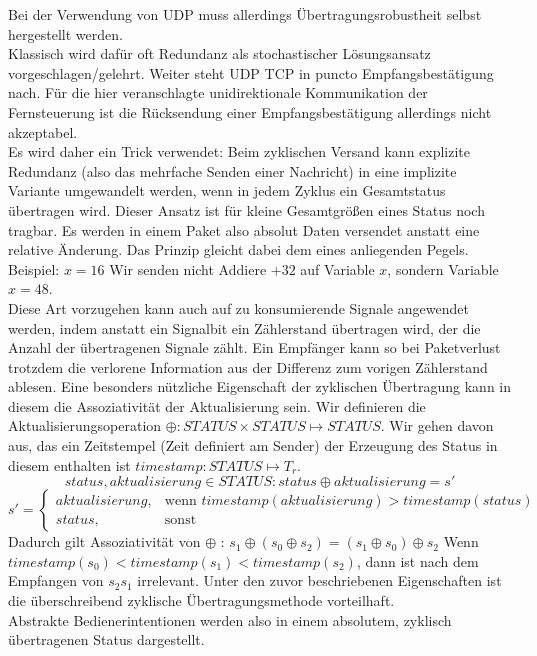 Bei der Verwendung von UDP muss allerdings Übertragungsrobustheit selbst hergestellt werden. \\
Klassisch wird dafür oft Redundanz als stochastischer Lösungsansatz vorgeschlagen/gelehrt.
Weiter steht UDP TCP in puncto Empfangsbestätigung nach. Für die hier veranschlagte unidirektionale Kommunikation der Fernsteuerung ist die Rücksendung einer Empfangsbestätigung allerdings nicht akzeptabel.\\
Es wird daher ein Trick verwendet:
Beim zyklischen Versand kann explizite Redundanz (also das mehrfache Senden einer Nachricht) in eine implizite Variante umgewandelt werden, wenn in jedem Zyklus ein Gesamtstatus übertragen wird.
Dieser Ansatz ist für kleine Gesamtgrößen eines Status noch tragbar.
Es werden in einem Paket also absolut Daten versendet anstatt eine relative Änderung. Das Prinzip gleicht dabei dem eines anliegenden Pegels. Beispiel:
$x = 16$ Wir senden nicht \glqq Addiere $+32$ auf Variable $x$\grqq , sondern \glqq Variable $x = 48$\grqq .\\
Diese Art vorzugehen kann auch auf zu konsumierende Signale angewendet werden, indem anstatt ein Signalbit ein Zählerstand übertragen wird, der die Anzahl der übertragenen Signale zählt. Ein Empfänger kann so bei Paketverlust trotzdem die verlorene Information aus der Differenz zum vorigen Zählerstand ablesen.
Eine besonders nützliche Eigenschaft der zyklischen Übertragung kann in diesem die Assoziativität der Aktualisierung sein. Wir definieren die Aktualisierungsoperation $\oplus : STATUS \times STATUS \mapsto STATUS$. Wir gehen davon aus, das ein Zeitstempel (Zeit definiert am Sender) der Erzeugung des Status in diesem enthalten ist $timestamp: STATUS \mapsto T_r$.
$$ status, aktualisierung \in STATUS : status \oplus aktualisierung = s' $$
$$
s' =
\begin{cases}
	aktualisierung,& \text{wenn } timestamp(aktualisierung) > timestamp(status)\\
    status,              & \text{sonst}
\end{cases}
 $$
 Dadurch gilt Assoziativität von $\oplus$ : $ s_1 \oplus (s_0 \oplus s_2) = (s_1 \oplus s_0) \oplus s_2 $
 Wenn $timestamp(s_0) < timestamp(s_1) < timestamp(s_2)$, dann ist nach dem Empfangen von $s_2 s_1$ irrelevant. Unter den zuvor beschriebenen Eigenschaften ist die überschreibend zyklische Übertragungsmethode vorteilhaft.\\
Abstrakte Bedienerintentionen werden also in einem absolutem, zyklisch übertragenen Status dargestellt.\\
